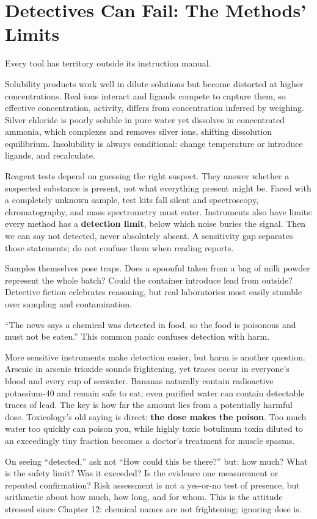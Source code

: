 \section{Detectives Can Fail: The Methods' Limits}

Every tool has territory outside its instruction manual.

Solubility products work well in dilute solutions but become distorted at higher concentrations. Real ions interact and ligands compete to capture them, so effective concentration, activity, differs from concentration inferred by weighing. Silver chloride is poorly soluble in pure water yet dissolves in concentrated ammonia, which complexes and removes silver ions, shifting dissolution equilibrium. Insolubility is always conditional: change temperature or introduce ligands, and recalculate.

Reagent tests depend on guessing the right suspect. They answer whether a suspected substance is present, not what everything present might be. Faced with a completely unknown sample, test kits fall silent and spectroscopy, chromatography, and mass spectrometry must enter. Instruments also have limits: every method has a \textbf{detection limit}, below which noise buries the signal. Then we can say not detected, never absolutely absent. A sensitivity gap separates those statements; do not confuse them when reading reports.

Samples themselves pose traps. Does a spoonful taken from a bag of milk powder represent the whole batch? Could the container introduce lead from outside? Detective fiction celebrates reasoning, but real laboratories most easily stumble over sampling and contamination.

\begin{wuqu}
``The news says a chemical was detected in food, so the food is poisonous and must not be eaten.'' This common panic confuses detection with harm.

More sensitive instruments make detection easier, but harm is another question. Arsenic in arsenic trioxide sounds frightening, yet traces occur in everyone's blood and every cup of seawater. Bananas naturally contain radioactive potassium-40 and remain safe to eat; even purified water can contain detectable traces of lead. The key is how far the amount lies from a potentially harmful dose. Toxicology's old saying is direct: \textbf{the dose makes the poison}. Too much water too quickly can poison you, while highly toxic botulinum toxin diluted to an exceedingly tiny fraction becomes a doctor's treatment for muscle spasms.

On seeing ``detected,'' ask not ``How could this be there?'' but: how much? What is the safety limit? Was it exceeded? Is the evidence one measurement or repeated confirmation? Risk assessment is not a yes-or-no test of presence, but arithmetic about how much, how long, and for whom. This is the attitude stressed since Chapter 12: chemical names are not frightening; ignoring dose is.
\end{wuqu}

